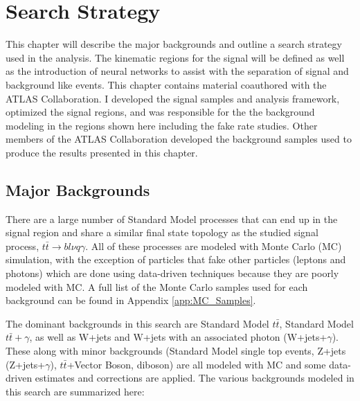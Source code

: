 
\chapter{Search Strategy}
\label{ch:SearchStrategy}
This chapter will describe the major backgrounds and outline a search strategy used in the analysis.  The kinematic regions for the signal will be defined as well as the introduction of neural networks to assist with the separation of signal and background like events.  This chapter contains material coauthored with the ATLAS Collaboration.  I developed the signal samples and analysis framework, optimized the signal regions, and was responsible for the the background modeling in the regions shown here including the fake rate studies.  Other members of the ATLAS Collaboration developed the background samples used to produce the results presented in this chapter.


\section{Major Backgrounds}
There are a large number of Standard Model processes that can end up in the signal region and share a similar final state topology as the studied signal process, $t\bar{t}\rightarrow b l \nu q \gamma$.  All of these processes are modeled with Monte Carlo (MC) simulation, with the exception of particles that fake other particles (leptons and photons) which are done using data-driven techniques because they are poorly modeled with MC.  A full list of the Monte Carlo samples used for each background can be found in Appendix \ref{app:MC_Samples}. 

The dominant backgrounds in this search are Standard Model $t\bar{t}$, Standard Model $t\bar{t}+\gamma$, as well as W+jets and W+jets with an associated photon (W+jets+$\gamma$).  These along with minor backgrounds (Standard Model single top events, Z+jets (Z+jets+$\gamma$), $t\bar{t}$+Vector Boson, diboson) are all modeled with MC and some data-driven estimates and corrections are applied.  The various backgrounds modeled in this search are summarized here:

